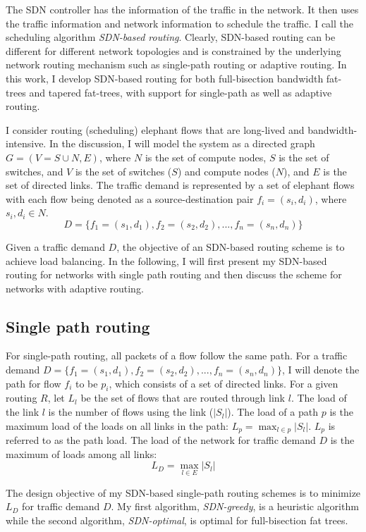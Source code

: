 The SDN controller has the information of the traffic in
the network. It then uses the traffic information and network information
to schedule the traffic. I call the scheduling algorithm {\em SDN-based
routing}. Clearly, SDN-based routing can be different
for different network topologies and is constrained by the underlying
network routing mechanism such as single-path routing or adaptive routing. 
In this work, I develop SDN-based routing for both full-bisection bandwidth
fat-trees and tapered fat-trees, with support for single-path as well as
adaptive routing.

I consider routing (scheduling) elephant flows that are long-lived
and bandwidth-intensive. In the discussion, I will
model the system as a directed
graph \( G = (V=S\cup N, E) \), where $N$ is the set of compute nodes,
$S$ is the set of switches, and $V$ is the set of switches ($S$) and
compute nodes ($N$), and \( E \) is the set of directed links.
The traffic demand is represented by a set of
elephant flows with each flow being denoted as a source-destination pair
$f_i = (s_i, d_i)$, where $s_i, d_i \in N$.
\[D = \{f_1=(s_1, d_1), f_2=(s_2, d_2), ..., f_n = (s_n, d_n)\}\] 

Given a traffic demand $D$, the objective of an SDN-based routing scheme is to
achieve load balancing. In the following, I will first present my SDN-based
routing for networks with single path routing and then discuss the
scheme for networks with adaptive routing.

\subsection{Single path routing}

For single-path routing, all packets of a flow
follow the same path. For a traffic demand
$D = \{f_1=(s_1, d_1), f_2=(s_2, d_2), ..., f_n = (s_n, d_n)\}$, 
I will denote the path for flow $f_i$ to be $p_i$, which consists of a set
of directed links. For a given routing $R$,
let $L_l$ be the set of flows that are routed through link $l$.
The load of the link $l$ is the number of flows using the link ($|S_l|$).
The load of a path $p$ is the maximum load of the loads on all links
in the path: $L_p = \max_{l \in p} {|S_l|}$. $L_p$ is referred to as the path
load. The load of the network for traffic demand $D$
is the maximum of loads among all links:
\[L_D = \max_{l\in E} {|S_l|}\]

The design objective of my SDN-based single-path routing schemes is to
minimize $L_D$ for traffic demand $D$. My first algorithm,
\textit{SDN-greedy}, is a heuristic algorithm while the second algorithm,
\textit{SDN-optimal}, is optimal for full-bisection fat trees. 

